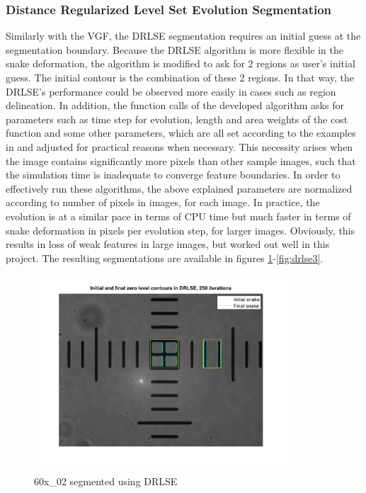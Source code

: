 \documentclass{article}
\begin{document}
\subsubsection*{Distance Regularized Level Set Evolution Segmentation}
Similarly with the VGF, the DRLSE segmentation requires an initial guess at the segmentation boundary. Because the DRLSE algorithm is more flexible in the snake deformation, the algorithm is modified to ask for 2 regions as user's initial guess. The initial contour is the combination of these 2 regions. In that way, the DRLSE's performance could be observed more easily in cases such as region delineation. In addition, the function calls of the developed algorithm asks for parameters such as time step for evolution, length and area weights of the cost function and some other parameters, which are all set according to the examples in \cite{gvf} and adjusted for practical reasons when necessary. This necessity arises when the image contains significantly more pixels than other sample images, such that the simulation time is inadequate to converge feature boundaries. In order to effectively run these algorithms, the above explained parameters are normalized according to number of pixels in images, for each image. In practice, the evolution is at a similar pace in terms of CPU time but much faster in terms of snake deformation in pixels per evolution step, for larger images. Obviously, this results in loss of weak features in large images, but worked out well in this project. The resulting segmentations are available in figures \ref{fig:drlse1}-\ref{fig:drlse3}. 

\begin{figure}
\centering
\includegraphics[width=0.85\textwidth]{figures/drlse1.pdf}
\caption{60x\_02 segmented using DRLSE}
\label{fig:drlse1}
\end{figure}
\end{document}
